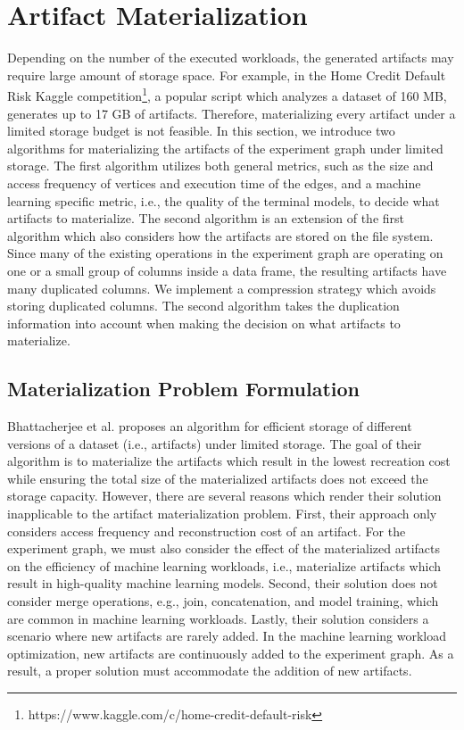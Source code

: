 \section{Artifact Materialization}\label{sec-materialization}
Depending on the number of the executed workloads, the generated artifacts may require large amount of storage space.
For example, in the Home Credit Default Risk Kaggle competition\footnote{https://www.kaggle.com/c/home-credit-default-risk}, a popular script which analyzes a dataset of 160 MB, generates up to 17 GB of artifacts.
Therefore, materializing every artifact under a limited storage budget is not feasible.
In this section, we introduce two algorithms for materializing the artifacts of the experiment graph under limited storage.
The first algorithm utilizes both general metrics, such as the size and access frequency of vertices and execution time of the edges, and a machine learning specific metric, i.e., the quality of the terminal models, to decide what artifacts to materialize.
The second algorithm is an extension of the first algorithm which also considers how the artifacts are stored on the file system.
Since many of the existing operations in the experiment graph are operating on one or a small group of columns inside a data frame, the resulting artifacts have many duplicated columns.
We implement a compression strategy which avoids storing duplicated columns.
The second algorithm takes the duplication information into account when making the decision on what artifacts to materialize.

\subsection{Materialization Problem Formulation}\label{subsec-materialization-problem}
Bhattacherjee et al. \cite{bhattacherjee2015principles} proposes an algorithm for efficient storage of different versions of a dataset (i.e., artifacts) under limited storage.
The goal of their algorithm is to materialize the artifacts which result in the lowest recreation cost while ensuring the total size of the materialized artifacts does not exceed the storage capacity.
However, there are several reasons which render their solution inapplicable to the artifact materialization problem.
First, their approach only considers access frequency and reconstruction cost of an artifact.
For the experiment graph, we must also consider the effect of the materialized artifacts on the efficiency of machine learning workloads, i.e., materialize artifacts which result in high-quality machine learning models.
Second, their solution does not consider merge operations, e.g., join, concatenation, and model training, which are common in machine learning workloads.
Lastly, their solution considers a scenario where new artifacts are rarely added.
In the machine learning workload optimization, new artifacts are continuously added to the experiment graph.
As a result, a proper solution must accommodate the addition of new artifacts.

